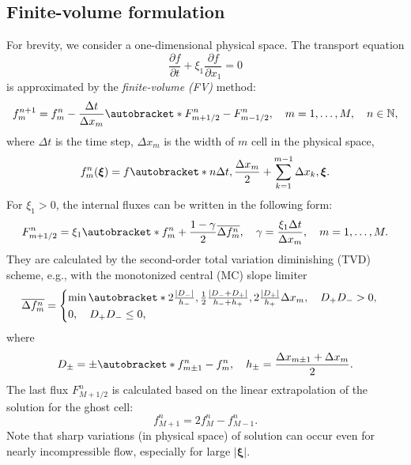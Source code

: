 \documentclass{article}
\newcommand{\pder}[2][]{\frac{\partial#1}{\partial#2}}
\DeclarePairedDelimiter\autobracket()       %
\newcommand{\br}[1]{\autobracket*{#1}}
\newcommand{\bxi}{{\boldsymbol{\xi}}}
\begin{document}
\subsection{Finite-volume formulation}\label{sec:fv}

For brevity, we consider a one-dimensional physical space.
The transport equation
\begin{equation}\label{eq:transport}
    \pder[f]{t} + \xi_1\pder[f]{x_1} = 0
\end{equation}
is approximated by the \emph{finite-volume (FV)} method:
\begin{equation}\label{eq:finite_volume}
    f^{n+1}_m = f^n_m - \frac{\Delta{t}}{\Delta{x_m}}\br{F^n_{m+1/2}-F^n_{m-1/2}}, \quad
    m = 1,\dots,M, \quad n\in\mathbb{N},
\end{equation}
where \(\Delta{t}\) is the time step, \(\Delta{x_m}\) is the width of \(m\) cell in the physical space,
\begin{equation}\label{eq:vdf_fv}
    f^n_m(\bxi) = f\br{n\Delta{t}, \frac{\Delta{x_m}}2 + \sum_{k=1}^{m-1}\Delta{x_k}, \bxi}.
\end{equation}
For \(\xi_1>0\), the internal fluxes can be written in the following form:
\begin{equation}\label{eq:internal_fluxes}
    F_{m+1/2}^n = \xi_1\br{ f_m^n + \frac{1-\gamma}2\overline{\Delta{f_m^n}}},
    \quad \gamma = \frac{\xi_1\Delta{t}}{\Delta{x_m}}, \quad m = 1,\dots,M.
\end{equation}
They are calculated by the second-order total variation diminishing (TVD) scheme,
e.g., with the monotonized central (MC) slope limiter
\begin{equation}\label{eq:limiter}
    \overline{\Delta{f_m^n}} = \begin{cases}\min\br{
         2\frac{|D_-|}{h_-}, \frac12\frac{|D_-+D_+|}{h_-+h_+}, 2\frac{|D_+|}{h_+}
    }\Delta{x_m}, \quad D_+D_- > 0, \\
    0, \quad D_+D_- \leq 0,
    \end{cases}
\end{equation}
where
\begin{equation}\label{eq:differences}
    D_\pm = \pm\br{f_{m\pm1}^n - f_m^n}, \quad h_\pm = \frac{\Delta{x_{m\pm1}} + \Delta{x_m}}2.
\end{equation}
The last flux \(F_{M+1/2}^n\) is calculated based on the linear extrapolation of the solution for the ghost cell:
\begin{equation}\label{eq:last_ghost}
    f_{M+1}^n = 2f_M^n - f_{M-1}^n.
\end{equation}
Note that sharp variations (in physical space) of solution can occur even for nearly incompressible flow,
especially for large \(|\bxi|\).
\end{document}
